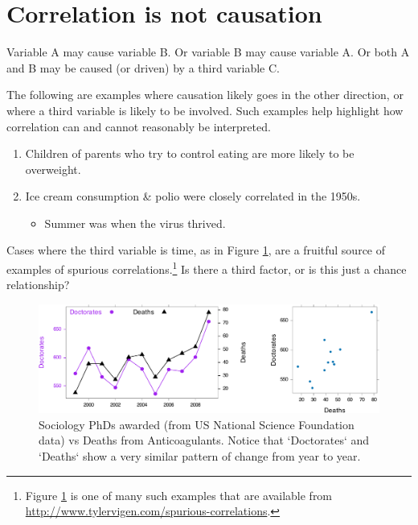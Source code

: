 \documentclass[
  10pt,
  b5paper]{book}
\providecommand{\tightlist}{%
  \setlength{\itemsep}{0pt}\setlength{\parskip}{0pt}}
\begin{document}
\hypertarget{correlation-is-not-causation}{%
\section{Correlation is not causation}\label{correlation-is-not-causation}}

Variable A may cause variable B. Or variable B may cause variable A. Or both A and B may be caused (or driven) by a third variable C.

The following are examples where causation likely goes in the other direction, or where a third variable is likely to be involved. Such examples help highlight how correlation can and cannot reasonably be interpreted.

\begin{enumerate}
\def\labelenumi{\arabic{enumi}.}
\tightlist
\item
  Children of parents who try to control eating are more likely to be overweight.
\item
  Ice cream consumption \& polio were closely correlated in the 1950s.

  \begin{itemize}
  \tightlist
  \item
    Summer was when the virus thrived.
  \end{itemize}
\end{enumerate}

Cases where the third variable is time, as in Figure \ref{fig:socAnti}, are a fruitful source of examples of spurious correlations.\footnote{Figure \ref{fig:socAnti} is one of many such examples that are available from\\
  \url{http://www.tylervigen.com/spurious-correlations}.} Is there a third factor, or is this just a chance relationship?

\begin{figure}

{\centering \includegraphics[width=1\linewidth]{07-regress_files/figure-latex/socAnti-1} 

}

\caption{Sociology PhDs awarded (from US National Science 
Foundation data) vs Deaths from Anticoagulants.  Notice
that `Doctorates` and `Deaths` show a very similar pattern
of change from year to year.}\label{fig:socAnti}
\end{figure}
\end{document}
